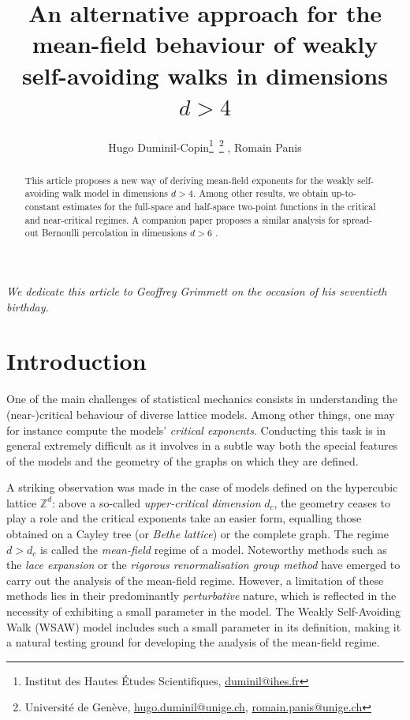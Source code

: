 \documentclass[11pt,a4paper]{article}
\title{An alternative approach for the mean-field behaviour of weakly self-avoiding walks in dimensions $d>4$}
\numberwithin{equation}{section}
\theoremstyle{plain}
\theoremstyle{definition}
\begin{document}
\author{Hugo Duminil-Copin\footnote{Institut des Hautes \'Etudes Scientifiques, \url{duminil@ihes.fr}}\ \footnotemark[2]\footnote{Université de Genève, \url{hugo.duminil@unige.ch}, \url{romain.panis@unige.ch}} , Romain Panis\footnotemark[2]}
\maketitle

{\em We dedicate this article to Geoffrey Grimmett on the occasion of his seventieth birthday.}

\begin{abstract}
This article proposes a new way of deriving mean-field exponents for the weakly self-avoiding walk model in dimensions $d>4$. Among other results, we obtain up-to-constant estimates for the full-space and half-space two-point functions in the critical and near-critical regimes. A companion paper proposes a similar analysis for spread-out Bernoulli percolation in dimensions $d>6$ \cite{DumPan24Perco}.
\end{abstract}

\section{Introduction}
One of the main challenges of statistical mechanics consists in understanding the (near-)critical behaviour of diverse lattice models. Among other things, one may for instance compute the models' \emph{critical exponents}. Conducting this task is in general extremely difficult as it involves in a subtle way both the special features of the models and the geometry of the graphs on which they are defined.

 A striking observation was made in the case of models defined on the hypercubic lattice $\mathbb Z^d$: above a so-called \emph{upper-critical dimension} $d_c$, the geometry ceases to play a role and the critical exponents take an easier form, equalling those obtained on a Cayley tree (or \emph{Bethe lattice}) or the complete graph. The regime $d>d_c$ is called the \emph{mean-field} regime of a model. Noteworthy methods such as the \emph{lace expansion} \cite{BrydgesSpencerSAW} 
 or the \emph{rigorous renormalisation group method} \cite{BauerschmidtBrydgesSlade2014Phi4fourdim,BauerschmidtBrydgesSlade2015WSAW4D,BauerschmidtBrydgesSlade2015WSAW4DLogCorrections,BauerschmidtBrydgesSladeBOOKRG2019}
 have emerged to carry out the analysis of the mean-field regime. However, a limitation
of these methods lies in their predominantly \emph{perturbative} nature, which is reflected in the necessity of exhibiting a small parameter in the model. The Weakly Self-Avoiding Walk (WSAW) model includes such a small parameter in its definition, making it a natural testing ground for developing the analysis of the mean-field regime.
\end{document}
